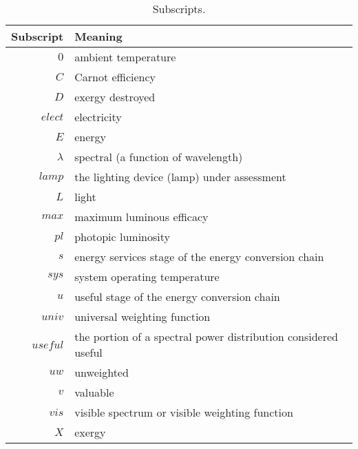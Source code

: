  


  
\begin{table}
\centering
\caption{Subscripts.}
\begin{tabular}{r l}
\toprule
Subscript & Meaning \\
\midrule
$0$ & ambient temperature \\
$C$ & Carnot efficiency \\
$D$ & exergy destroyed \\
$elect$ & electricity \\
$E$ & energy \\
$\lambda$ & spectral (a function of wavelength) \\
$lamp$ & the lighting device (lamp) under assessment \\
$L$ & light \\
$max$ & maximum luminous efficacy \\
$pl$ & photopic luminosity \\
$s$ & energy services stage of the energy conversion chain \\
$sys$ & system operating temperature \\
$u$ & useful stage of the energy conversion chain \\
$univ$ & universal weighting function \\
$useful$ & the portion of a spectral power distribution considered useful \\
$uw$ & unweighted \\
$v$ & valuable \\
$vis$ & visible spectrum or visible weighting function \\
$X$ & exergy \\
\bottomrule
\end{tabular}
\label{tab:subscripts}
\end{table}


